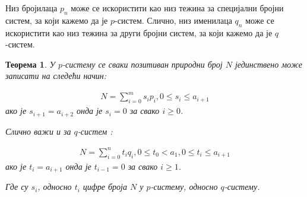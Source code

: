 \documentclass[a4paper]{article}
\newtheorem{theorem}{Теорема}
\begin{document}
Низ бројилаца $ p_{n} $ може се искористити као низ тежина за специјални бројни систем, за који кажемо да је $ p $-систем. Слично, низ именилаца $ q_{n} $ може се искористити као низ тежина за други бројни систем, за који кажемо да је $ q $-систем.

\begin{theorem}
	\label{thm:p_q_sistemi}
	У $ p $-систему се сваки позитиван природни број $ N $ јединствено може записати на следећи начин:
	
	\begin{eqnarray}
		\label{p_sistem} N = \sum_{i=0}^{m} s_{i}p_{i}, 0 \le s_{i} \le a_{i+1}
	\end{eqnarray}
	ако је $ s_{i+1} = a_{i+2} $ онда је $ s_{i} = 0  $ за свако $ i \ge 0 $.
	
	Слично важи и за $ q $-систем :
	
	\begin{eqnarray}
		\label{q_sistem} N = \sum_{i=0}^{n} t_{i}q_{i}, 0 \le t_{0} < a_{1}, 0 \le t_{i} \le a_{i+1}
	\end{eqnarray}
	ако је $ t_{i} = a_{i+1} $ онда је $ t_{i-1} = 0 $ за свако $ i \ge 1 $.
	
	Где су $ s_{i} $, односно $ t_{i} $ цифре броја $ N $  у $ p $-систему, односно $ q $-систему.
\end{theorem} 
\end{document}
